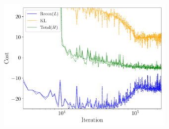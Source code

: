 \documentclass[aps,superscriptaddress,twocolumn,nopreprintnumbers,floatfix,groupedaddress]{revtex4-1}
\newcommand{\figwidth}{8.6cm}
\begin{document}
\begin{figure}
	\centering
	\includegraphics[width=\figwidth]{figs/cost.pdf}
	\caption{}
	\label{fig:learning_contours}
\end{figure}
\end{document}
